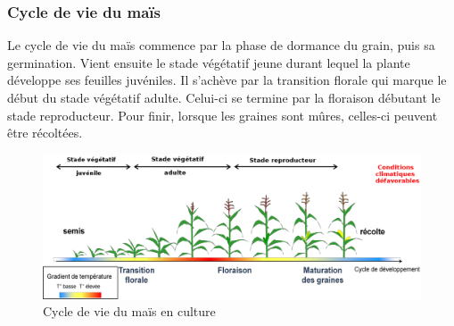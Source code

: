 \documentclass[12pt,a4paper]{report}
\begin{document}
				\subsubsection{Cycle de vie du maïs}
				Le cycle de vie du maïs commence par la phase de dormance du grain, puis sa germination. Vient ensuite le stade végétatif jeune durant lequel la plante développe ses feuilles juvéniles. Il s'achève par la transition florale qui marque le début du stade végétatif adulte. Celui-ci se termine par la floraison débutant le stade reproducteur. Pour finir, lorsque les graines sont mûres, celles-ci peuvent être récoltées. \cite{tenaillon2}
				\begin{figure}[!h]
					\centering
					\includegraphics[width=13.7cm]{cycle.png}
					\caption{Cycle de vie du maïs en culture}
					\label{Cycle de vie du maïs en culture}
				\end{figure}
					
			
\end{document}
